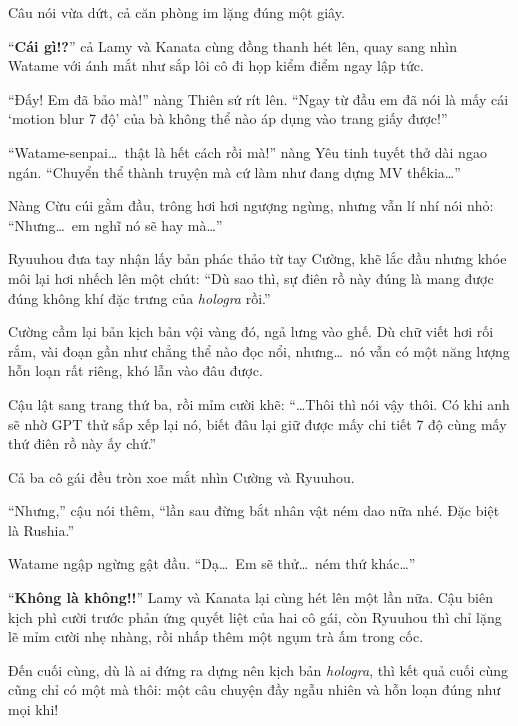 \documentclass[../main.tex]{subfiles}
\begin{document}
Câu nói vừa dứt, cả căn phòng im lặng đúng một giây.

``\textbf{Cái gì!?}'' cả Lamy và Kanata cùng đồng thanh hét lên, quay sang nhìn Watame với ánh mắt như sắp lôi cô đi họp kiểm điểm ngay lập tức.

``Đấy! Em đã bảo mà!'' nàng Thiên sứ rít lên. ``Ngay từ đầu em đã nói là mấy cái `motion blur 7 độ' của bà không thể nào áp dụng vào trang giấy được!''

``Watame-senpai\dots\ thật là hết cách rồi mà!'' nàng Yêu tinh tuyết thở dài ngao ngán. ``Chuyển thể thành truyện mà cứ làm như đang dựng MV thếkia\dots''

Nàng Cừu cúi gằm đầu, trông hơi hơi ngượng ngùng, nhưng vẫn lí nhí nói nhỏ: ``Nhưng\dots\ em nghĩ nó sẽ hay mà\dots''

Ryuuhou đưa tay nhận lấy bản phác thảo từ tay Cường, khẽ lắc đầu nhưng khóe môi lại hơi nhếch lên một chút: ``Dù sao thì, sự điên rồ này đúng là mang được đúng không khí đặc trưng của \textit{hologra} rồi.''

Cường cầm lại bản kịch bản vội vàng đó, ngả lưng vào ghế. Dù chữ viết hơi rối rắm, vài đoạn gần như chẳng thể nào đọc nổi, nhưng\dots\ nó vẫn có một năng lượng hỗn loạn rất riêng, khó lẫn vào đâu được.

Cậu lật sang trang thứ ba, rồi mỉm cười khẽ: ``\dots Thôi thì nói vậy thôi. Có khi anh sẽ nhờ GPT thử sắp xếp lại nó, biết đâu lại giữ được mấy chi tiết 7 độ cùng mấy thứ điên rồ này ấy chứ.''

Cả ba cô gái đều tròn xoe mắt nhìn Cường và Ryuuhou.

``Nhưng,'' cậu nói thêm, ``lần sau đừng bắt nhân vật ném dao nữa nhé. Đặc biệt là Rushia.''

Watame ngập ngừng gật đầu. ``Dạ\dots\ Em sẽ thử\dots\ ném thứ khác\dots''

``\textbf{Không là không!!}'' Lamy và Kanata lại cùng hét lên một lần nữa. Cậu biên kịch phì cười trước phản ứng quyết liệt của hai cô gái, còn Ryuuhou thì chỉ lặng lẽ mỉm cười nhẹ nhàng, rồi nhấp thêm một ngụm trà ấm trong cốc.

Đến cuối cùng, dù là ai đứng ra dựng nên kịch bản \textit{hologra}, thì kết quả cuối cùng cũng chỉ có một mà thôi: một câu chuyện đầy ngẫu nhiên và hỗn loạn đúng như mọi khi!
\end{document}
